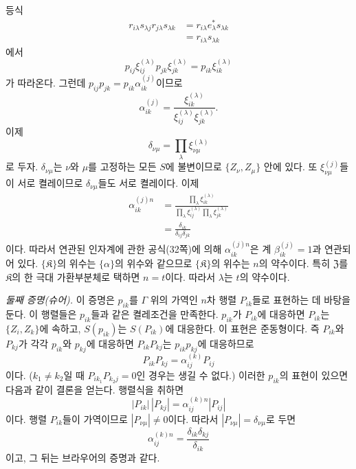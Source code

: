 등식
\[
\begin{aligned}
r_{i\lambda}s_{\lambda j}r_{j\lambda}s_{\lambda k}
 &=r_{i\lambda}e_\lambda^*s_{\lambda k}\\
 &=r_{i\lambda}s_{\lambda k}
\end{aligned}
\]
에서
\[
        p_{ij}\xi_{ij}^{(\lambda)}
        p_{jk}\xi_{jk}^{(\lambda)}
        =p_{ik}\xi_{ik}^{(\lambda)}
\]
가 따라온다. 그런데 \(p_{ij}p_{jk}=p_{ik}\alpha_{ik}^{(j)}\)이므로
\[
        \alpha_{ik}^{(j)}
        =\frac{\xi_{ik}^{(\lambda)}}
        {\xi_{ij}^{(\lambda)}\xi_{jk}^{(\lambda)}}.
\]
이제
\[
        \delta_{\nu\mu}
        =\prod_\lambda\xi_{\nu\mu}^{(\lambda)}
\]
로 두자. \(\delta_{\nu\mu}\)는 \(\nu\)와 \(\mu\)를 고정하는 모든 \(S\)에 불변이므로 \(\{Z_\nu,Z_\mu\}\) 안에 있다. 또 \(\xi_{\nu\mu}^{(j)}\)들이 서로 켤레이므로 \(\delta_{\nu\mu}\)들도 서로 켤레이다. 이제
\[
\begin{aligned}
\alpha_{ik}^{(j)n}
 &=\frac{\prod_\lambda\xi_{ik}^{(\lambda)}}
        {\prod_\lambda\xi_{ij}^{(\lambda)}
         \prod_\lambda\xi_{jk}^{(\lambda)}}\\
 &=\frac{\delta_{ik}}{\delta_{ij}\delta_{jk}}
\end{aligned}
\]
이다. 따라서 연관된 인자계에 관한 공식(32쪽)에 의해 \(\alpha_{ik}^{(j)n}\)은 계 \(\beta_{ik}^{(j)}=1\)과 연관되어 있다. \(\{\mathfrak K\}\)의 위수는 \(\{\alpha\}\)의 위수와 같으므로 \(\{\mathfrak K\}\)의 위수는 \(n\)의 약수이다. 특히 \(\mathfrak Z\)를 \(\mathfrak K\)의 한 극대 가환부분체로 택하면 \(n=t\)이다. 따라서 \(\lambda\)는 \(t\)의 약수이다.

\emph{둘째 증명(슈어).} 이 증명은 \(p_{ik}\)를 \(\Gamma\) 위의 가역인 \(n\)차 행렬 \(P_{ik}\)들로 표현하는 데 바탕을 둔다. 이 행렬들은 \(p_{ik}\)들과 같은 켤레조건을 만족한다. \(p_{ik}\)가 \(P_{ik}\)에 대응하면 \(P_{ik}\)는 \(\{Z_i,Z_k\}\)에 속하고, \(S(p_{ik})\)는 \(S(P_{ik})\)에 대응한다. 이 표현은 준동형이다. 즉 \(P_{ik}\)와 \(P_{kj}\)가 각각 \(p_{ik}\)와 \(p_{kj}\)에 대응하면 \(P_{ik}P_{kj}\)는 \(p_{ik}p_{kj}\)에 대응하므로
\[
        P_{ik}P_{kj}
        =\alpha_{ij}^{(k)}P_{ij}
\]
이다. (\(k_1\ne k_2\)일 때 \(P_{ik_1}P_{k_2j}=0\)인 경우는 생길 수 없다.) 이러한 \(p_{ik}\)의 표현이 있으면 다음과 같이 결론을 얻는다. 행렬식을 취하면
\[
        |P_{ik}|\,|P_{kj}|
        =\alpha_{ij}^{(k)n}|P_{ij}|
\]
이다. 행렬 \(P_{ik}\)들이 가역이므로 \(|P_{\nu\mu}|\ne0\)이다. 따라서 \(|P_{\nu\mu}|=\delta_{\nu\mu}\)로 두면
\[
        \alpha_{ij}^{(k)n}
        =\frac{\delta_{ik}\delta_{kj}}{\delta_{ik}}
\]
이고, 그 뒤는 브라우어의 증명과 같다.

